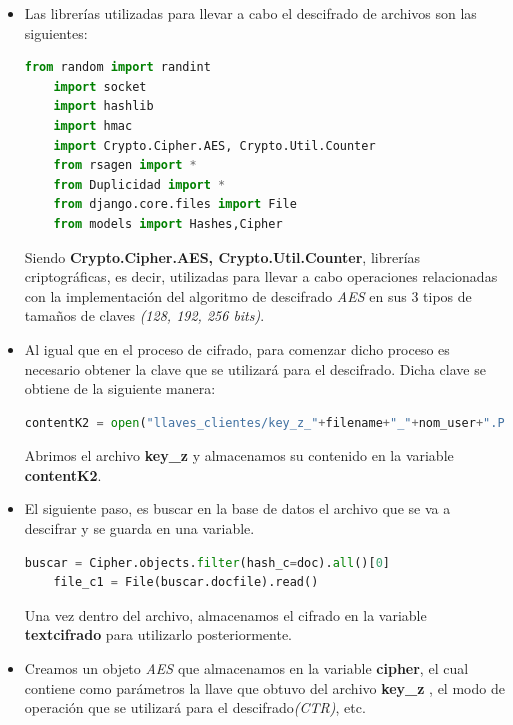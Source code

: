 \begin{itemize}
	\item Las librerías utilizadas para llevar a cabo el descifrado de archivos son las siguientes: 
			
\begin{lstlisting}[language=Python,frame=single, keywordstyle=\color{blue},breaklines=true,showstringspaces=false]
	from random import randint
	import socket
	import hashlib
	import hmac
	import Crypto.Cipher.AES, Crypto.Util.Counter
	from rsagen import *
	from Duplicidad import *
	from django.core.files import File
	from models import Hashes,Cipher
\end{lstlisting}

Siendo \textbf{Crypto.Cipher.AES, Crypto.Util.Counter}, librerías criptográficas, es decir, utilizadas para llevar a cabo operaciones relacionadas con la implementación del algoritmo de descifrado \textit{AES} en sus 3 tipos de tamaños de claves \textit{(128, 192, 256 bits)}. 

	\item Al igual que en el proceso de cifrado, para comenzar dicho proceso es necesario obtener la clave que se utilizará para el descifrado. Dicha clave se obtiene de la siguiente manera:  

\begin{lstlisting}[language=Python,frame=single, keywordstyle=\color{blue},breaklines=true,showstringspaces=false]
    contentK2 = open("llaves_clientes/key_z_"+filename+"_"+nom_user+".PEM", "rb").read()
\end{lstlisting}

Abrimos el archivo \textbf{key\_z} y almacenamos su contenido en la variable \textbf{contentK2}. 

		\item El siguiente paso, es buscar en la base de datos el archivo que se va a descifrar y se guarda en una variable. 
			
\begin{lstlisting}[language=Python,frame=single, keywordstyle=\color{blue},breaklines=true,showstringspaces=false]
    buscar = Cipher.objects.filter(hash_c=doc).all()[0]
    file_c1 = File(buscar.docfile).read()
\end{lstlisting}

Una vez dentro del archivo, almacenamos el cifrado en la variable \textbf{textcifrado} para utilizarlo posteriormente. 

		\item Creamos un objeto \textit{AES} que almacenamos en la variable \textbf{cipher}, el cual contiene como parámetros la llave que obtuvo del archivo \textbf{key\_z }, el modo de operación que se utilizará para el descifrado\textit{(CTR)}, etc.
			

\end{itemize}
